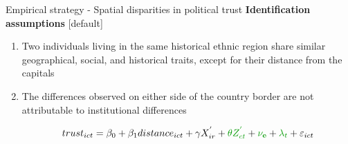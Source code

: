 \documentclass[10pt]{beamer}
\begin{document}
\begin{frame}{Empirical strategy - Spatial disparities in political trust}
    \centering \textcolor{rougeprez}{\textbf{Identification assumptions}}\vfill
    [default]
    \begin{enumerate}
        \item Two individuals living in the same historical ethnic region share similar geographical, social, and historical traits, except for their distance from the capitals\vfill
        \item The differences observed on either side of the country border are not attributable to institutional differences\vfill
        
\begin{equation}
    trust_{ict}=\beta_{0}+\beta_{1}distance_{ict}+\gamma X^{'}_{ir}+ \textcolor[rgb]{0.0,0.6,0.0}{\theta Z^{'}_{ct}} + \textcolor[rgb]{0.0,0.6,0.0}{\mathbf{\nu_{e}}}+\textcolor[rgb]{0.0,0.6,0.0}{\lambda_{t}}+\varepsilon_{ict}
    \end{equation}
            
    \end{enumerate}
\end{frame}
\end{document}
